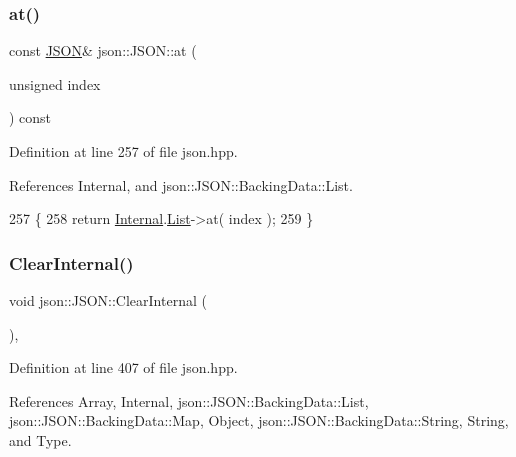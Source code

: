 \subsubsection{\texorpdfstring{at()}{at()}\hspace{0.1cm}{\footnotesize\ttfamily [4/4]}}
{\footnotesize\ttfamily const \mbox{\hyperlink{classjson_1_1_j_s_o_n}{J\+S\+ON}}\& json\+::\+J\+S\+O\+N\+::at (\begin{DoxyParamCaption}\item[{unsigned}]{index }\end{DoxyParamCaption}) const\hspace{0.3cm}{\ttfamily [inline]}}



Definition at line 257 of file json.\+hpp.



References Internal, and json\+::\+J\+S\+O\+N\+::\+Backing\+Data\+::\+List.


\begin{DoxyCode}
257                                                \{
258             \textcolor{keywordflow}{return} \mbox{\hyperlink{classjson_1_1_j_s_o_n_a1e2a064794c3d55c8bb8887fc5734947}{Internal}}.\mbox{\hyperlink{unionjson_1_1_j_s_o_n_1_1_backing_data_ab85f5e7ad21f9f7a5407ab73128a3ebc}{List}}->at( index );
259         \}
\end{DoxyCode}
\mbox{\label{classjson_1_1_j_s_o_n_afefdc8c18c2c40575c2c8463fbd78c67}} 
\subsubsection{\texorpdfstring{Clear\+Internal()}{ClearInternal()}}
{\footnotesize\ttfamily void json\+::\+J\+S\+O\+N\+::\+Clear\+Internal (\begin{DoxyParamCaption}{ }\end{DoxyParamCaption})\hspace{0.3cm}{\ttfamily [inline]}, {\ttfamily [private]}}



Definition at line 407 of file json.\+hpp.



References Array, Internal, json\+::\+J\+S\+O\+N\+::\+Backing\+Data\+::\+List, json\+::\+J\+S\+O\+N\+::\+Backing\+Data\+::\+Map, Object, json\+::\+J\+S\+O\+N\+::\+Backing\+Data\+::\+String, String, and Type.



